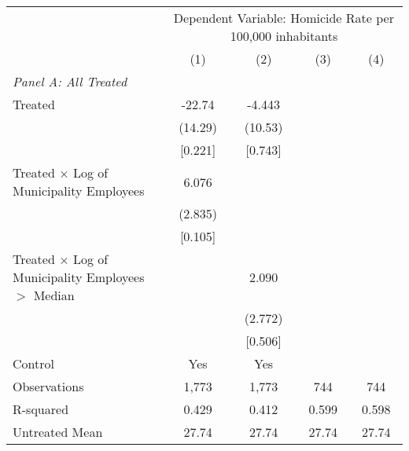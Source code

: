 \documentclass{article}
\begin{document}
\begin{table}[htbp]
\begin{adjustbox}{max width=\textwidth}
\begin{threeparttable}
\begin{tabular}{lcccc}
\toprule
& \multicolumn{4}{c}{Dependent Variable: Homicide Rate per 100,000 inhabitants} \\
\cmidrule(lr){2-5}
& (1) & (2) & (3) & (4) \\
\midrule
\multicolumn{5}{l}{\textit{Panel A: All Treated}} \\
[0.5em]
Treated & -22.74 & -4.443 & & \\
& (14.29) & (10.53) & & \\
& [0.221] & [0.743] & & \\
[0.5em]
Treated × Log of Municipality Employees & 6.076 & & & \\
& (2.835) & & & \\
& [0.105] & & & \\
[0.5em]
Treated × Log of Municipality Employees $>$ Median & & 2.090 & & \\
& & (2.772) & & \\
& & [0.506] & & \\
[0.5em]
\midrule
Control & Yes & Yes \\
Observations & 1,773 & 1,773 & 744 & 744 \\
R-squared & 0.429 & 0.412 & 0.599 & 0.598 \\
Untreated Mean & 27.74 & 27.74 & 27.74 & 27.74 \\
\bottomrule
\end{tabular}
\end{threeparttable}
\end{adjustbox}
\end{table}
\end{document}
